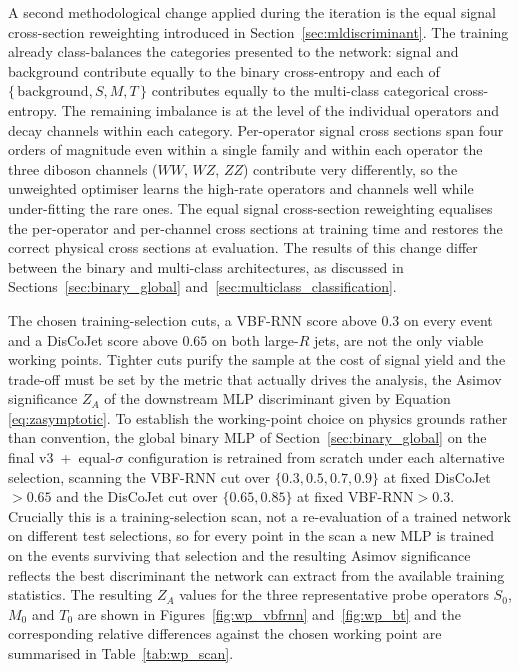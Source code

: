 A second methodological change applied during the iteration is the equal signal cross-section reweighting introduced in Section~\ref{sec:mldiscriminant}. The training already class-balances the categories presented to the network: signal and background contribute equally to the binary cross-entropy and each of $\{\,\mathrm{background},S,M,T\,\}$ contributes equally to the multi-class categorical cross-entropy. The remaining imbalance is at the level of the individual operators and decay channels within each category. Per-operator signal cross sections span four orders of magnitude even within a single family and within each operator the three diboson channels ($WW$, $WZ$, $ZZ$) contribute very differently, so the unweighted optimiser learns the high-rate operators and channels well while under-fitting the rare ones. The equal signal cross-section reweighting equalises the per-operator and per-channel cross sections at training time and restores the correct physical cross sections at evaluation. The results of this change differ between the binary and multi-class architectures, as discussed in Sections~\ref{sec:binary_global} and~\ref{sec:multiclass_classification}.

The chosen training-selection cuts, a VBF-RNN score above $0.3$ on every event and a DisCoJet score above $0.65$ on both large-$R$ jets, are not the only viable working points. Tighter cuts purify the sample at the cost of signal yield and the trade-off must be set by the metric that actually drives the analysis, the Asimov significance $Z_A$ of the downstream MLP discriminant given by Equation \ref{eq:zasymptotic}. To establish the working-point choice on physics grounds rather than convention, the global binary MLP of Section~\ref{sec:binary_global} on the final v3~+~equal-$\sigma$ configuration is retrained from scratch under each alternative selection, scanning the VBF-RNN cut over $\{0.3,0.5,0.7,0.9\}$ at fixed DisCoJet${}>0.65$ and the DisCoJet cut over $\{0.65,0.85\}$ at fixed VBF-RNN${}>0.3$. Crucially this is a training-selection scan, not a re-evaluation of a trained network on different test selections, so for every point in the scan a new MLP is trained on the events surviving that selection and the resulting Asimov significance reflects the best discriminant the network can extract from the available training statistics. The resulting $Z_A$ values for the three representative probe operators $S_0$, $M_0$ and $T_0$ are shown in Figures~\ref{fig:wp_vbfrnn} and~\ref{fig:wp_bt} and the corresponding relative differences against the chosen working point are summarised in Table~\ref{tab:wp_scan}.

